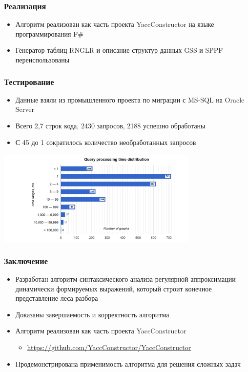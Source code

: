\documentclass{beamer}
\begin{document}
\begin{frame}
  \transwipe[direction=90]
  \frametitle{Реализация}
  \begin{itemize}
    \item Алгоритм реализован как часть проекта YaccConstructor на языке 
программирования F\#
    \item Генератор таблиц RNGLR и описание структур данных GSS и SPPF 
переиспользованы
 \end{itemize}
\end{frame}

\begin{frame}[t]
  \transwipe[direction=90]
  \frametitle{Тестирование}
  \begin{itemize}
    \item Данные взяли из промышленного проекта по миграции с MS-SQL на Oracle Server 
    \item Всего 2,7 строк кода, 2430 запросов, 2188 успешно обработаны
    \item С 45 до 1 сократилось количество необработанных запросов
  \end{itemize}
  \includegraphics[width=10cm]{pictures/dist.png}
\end{frame}


\begin{frame}
  \transwipe[direction=90]
  \frametitle{Заключение}
  \begin{itemize}
    \item Разработан алгоритм синтаксического анализа регулярной аппроксимации 
динамически формируемых выражений, который строит конечное представление леса 
разбора 
    \item Доказаны завершаемость и корректность алгоритма
    \item Алгоритм реализован как часть проекта YaccConstructor
    \begin{itemize}
      \item \url{https://github.com/YaccConstructor/YaccConstructor}
    \end{itemize}
    \item Продемонстрирована применимость алгоритма для решения 
сложных задач
  \end{itemize}
\end{frame}
\end{document}
